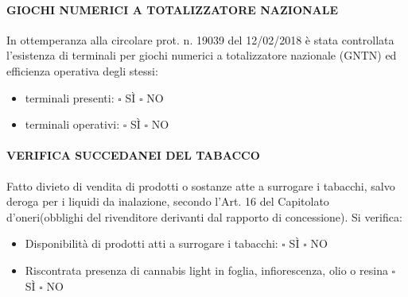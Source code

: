 \documentclass[12pt]{article}
\begin{document}
\paragraph{GIOCHI NUMERICI A TOTALIZZATORE NAZIONALE}
In ottemperanza alla circolare prot. n. 19039 del 12/02/2018 è stata controllata l’esistenza di terminali per giochi numerici a totalizzatore nazionale (GNTN) ed efficienza operativa degli stessi:
\begin{multicols}{2}
    \begin{itemize}
        \item terminali presenti: \begin{math}\square\end{math} SÌ \begin{math}\square\end{math} NO
        \item terminali operativi: \begin{math}\square\end{math} SÌ \begin{math}\square\end{math} NO
    \end{itemize}
\end{multicols}

\paragraph{VERIFICA SUCCEDANEI DEL TABACCO} Fatto divieto di vendita di prodotti o sostanze atte a surrogare i tabacchi, salvo deroga per i liquidi da inalazione, secondo l'Art. 16 del Capitolato d'oneri(obblighi del rivenditore derivanti dal rapporto di concessione). Si verifica:
\begin{itemize}
    \item Disponibilità di prodotti atti a surrogare i tabacchi: \begin{math}\square\end{math} SÌ \begin{math}\square\end{math} NO
    \item Riscontrata presenza di cannabis light in foglia, infiorescenza, olio o resina \begin{math}\square\end{math} SÌ \begin{math}\square\end{math} NO
\end{itemize}
\end{document}
